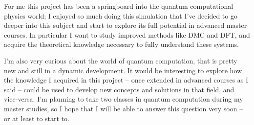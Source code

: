 For me this project has been a springboard into the quantum computational physics world; I enjoyed so much doing this simulation that I've decided to go deeper into this subject and start to explore its full potential in advanced master courses. In particular I want to study improved methods like DMC and DFT, and acquire the theoretical knowledge necessary to fully understand these systems.

I'm also very curious about the world of quantum computation, that is pretty new and still in a dynamic development. It would be interesting to explore how the knowledge I acquired in this project -- once extended in advanced courses as I said -- could be used to develop new concepts and solutions in that field, and vice-versa. I'm planning to take two classes in quantum computation during my master studies, so I hope that I will be able to answer this question very soon -- or at least to start to.